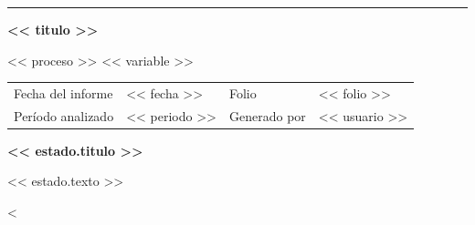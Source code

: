 \documentclass[11pt,a4paper]{article}
\newcommand{\nota}[1]{\textcolor{gris}{\small #1}}
\begin{document}
{\color{petroleo}\rule{\linewidth}{2pt}}\par\vspace{4pt}
{\fontsize{24}{28}\selectfont\bfseries\color{tinta} << titulo >>\par}
\vspace{2pt}
{\large\color{gris} << proceso >> \textperiodcentered{} << variable >>\par}
\vspace{8pt}
\begin{tabularx}{\linewidth}{@{}l X l X@{}}
\nota{Fecha del informe} & << fecha >> & \nota{Folio} & << folio >> \\
\nota{Período analizado} & << periodo >> & \nota{Generado por} & << usuario >> \\
\end{tabularx}

\vspace{6pt}
\noindent\colorbox{<< estado.fondo >>}{\begin{minipage}{\dimexpr\linewidth-2\fboxsep\relax}
\vspace{6pt}
{\Large\bfseries\color{<< estado.color >>} << estado.titulo >>\par}
\vspace{2pt}
<< estado.texto >>\par
\vspace{6pt}
\end{minipage}}

<%
\end{document}
